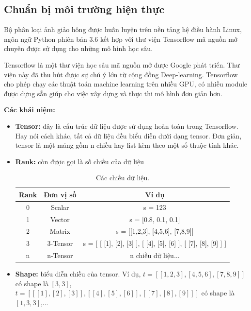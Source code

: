 \subsection{Chuẩn bị môi trường hiện thực}
	Bộ phân loại ảnh giảo hông được huấn luyện trên nền tảng hệ điều hành Linux, ngôn ngữ Python phiên bản 3.6 kết hợp với thư viện Tensorflow mã nguồn mở chuyên được sử dụng cho những mô hình học sâu.\par
	Tensorflow\cite{tf} là một thư viện học sâu mã nguồn mở được Google phát triển. Thư viện này đã thu hút được sự chú ý lớn từ cộng đồng Deep-learning. Tensorflow cho phép chạy các thuật toán machine learning trên nhiều GPU, có nhiều module được dựng sẵn giúp cho việc xây dựng và thực thi mô hình đơn giản hơn. \par
	\textbf{Các khái niệm:}
	\begin{itemize}
		\item \textbf{Tensor:} đây là cấu trúc dữ liệu được sử dụng hoàn toàn trong Tensorflow. Hay nói cách khác, tất cả dữ liệu đều biểu diễn dưới dạng tensor. Đơn giản, tensor là một mảng gồm n chiều hay list kèm theo một số thuộc tính khác.
		
		\item \textbf{Rank:} còn được gọi là số chiều của dữ liệu
		\begin{table}[h!]
			\centering
			\begin{tabular}{ | c | c | c | }
 			\hline
 			 \textbf{Rank} & \textbf{Đơn vị số} & \textbf{Ví dụ}\\
 			\hline
 			0  & Scalar  & s = 123  \\
			\hline
			1 & Vector & s = [0.8, 0.1, 0.1]	\\
			\hline
			2 & Matrix & s = [[1,2,3], [4,5,6], [7,8,9]]	\\
			\hline
			3 & 3-Tensor & s = [ [ [1], [2], [3] ], [ [4], [5], [6] ], [ [7], [8], [9] ] ]	\\
			\hline
			n & n-Tensor & n chiều dữ liệu... \\
			\hline
			
		\end{tabular}
		\caption{Các chiều dữ liệu.}
		\label{table:rank}
		\end{table}
		
		
		
		
		\item \textbf{Shape:} biểu diễn chiều của tensor. Ví dụ, \(t = [[1,2,3], [4,5,6], [7,8,9]]\) có shape là \([3, 3]\), \(t = [ [ [1], [2], [3] ], [ [4], [5], [6] ], [ [7], [8], [9] ] ]\) có shape là \([1, 3, 3]\),...
		

\end{itemize}
